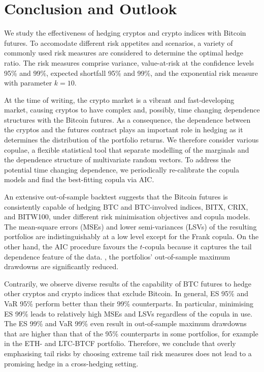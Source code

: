 \section{Conclusion and Outlook}\label{sec:conclusion-and-outlook}
We study the effectiveness of hedging cryptos and crypto indices with
Bitcoin futures.
To accomodate different risk appetites and scenarios, a variety of
commonly used risk measures are considered to determine the optimal
hedge ratio. The risk measures comprise variance, value-at-risk at
the confidence levels 95\% and 99\%, expected shortfall 95\% and 99\%,
and the exponential risk measure with parameter $k=10$.

At the time of writing, the crypto market is a vibrant and
fast-developing market, causing cryptos to have complex and, possibly,
time  changing dependence structures with the Bitcoin futures.
As a consequence, the dependence between the cryptos and the futures
contract plays an important role in hedging as it determines the
distribution of the portfolio returns. We therefore consider various
copulae, a flexible statistical tool that separate modelling of the
marginals and the dependence structure of multivariate random
vectors. To address the potential time changing dependence, we
periodically re-calibrate the copula models and find the best-fitting
copula via  AIC. 

An extensive out-of-sample backtest suggests that the Bitcoin futures
is consistently capable of hedging BTC and BTC-involved indices, 
BITX, CRIX, and BITW100, under different risk minimisation objectives
and copula models. The mean-square errors (MSEs) and lower
semi-variances (LSVs) of the resulting portfolios are
indistinguishably at a low level except for the Frank copula. 
On the other hand, the AIC procedure favours the $t$-copula because it 
captures the tail dependence feature of the data. , the
portfolios' out-of-sample maximum drawdowns are significantly reduced. 

Contrarily, we observe diverse results of the capability of BTC
futures to hedge other cryptos and crypto indices that exclude Bitcoin. 
In general, ES 95\% and VaR 95\% perform better than their 99\%
counterparts. In particular, minimising ES 99\% leads to relatively
high MSEs and LSVs regardless of the copula in use. The ES 99\% and
VaR 99\% even result in out-of-sample maximum drawdowns that are
higher than that of the 95\% counterparts in some portfolios, 
for example in the ETH- and LTC-BTCF portfolio.
Therefore, we conclude that overly emphasising tail risks by choosing
extreme tail risk measures does not lead to a promising hedge in a
cross-hedging setting. 

